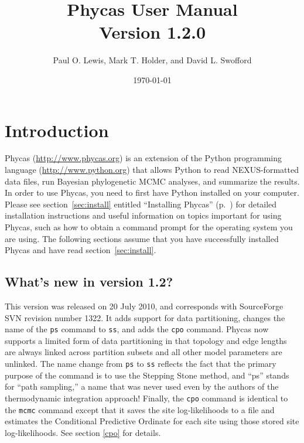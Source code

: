 \documentclass[10pt]{article}
\newcommand{\currPhycasVersion}{1.2.0}			%
\newcommand{\currReleaseDate}{20 July 2010}		%
\newcommand{\currReleaseSVNBuild}{1322}			%
\newcommand{\cmd}[1]{{\tt \small #1}\index{#1}}	%
\begin{document}
\title{{\sc Phycas User Manual} \\ Version \currPhycasVersion}
\author{Paul O. Lewis, Mark T. Holder, and David L. Swofford}
\date{\today}
\maketitle

\tableofcontents
\clearpage
\section{Introduction}

Phycas (\url{http://www.phycas.org}) is an extension of the Python programming language (\url{http://www.python.org}) that allows Python to read NEXUS-formatted data files, run Bayesian phylogenetic MCMC analyses, and summarize the results. In order to use Phycas, you need to first have Python installed on your computer. Please see section~\ref{sec:install} entitled ``Installing Phycas'' (p.~\pageref{sec:install}) for detailed installation instructions and useful information on topics important for using Phycas, such as how to obtain a command prompt for the operating system you are using. The following sections assume that you have successfully installed Phycas and have read section~\ref{sec:install}.

\subsection{What's new in version 1.2?} %
This version was released on \currReleaseDate, and corresponds with SourceForge SVN revision number \currReleaseSVNBuild. It adds support for data partitioning, changes the name of the \cmd{ps} command to \cmd{ss}, and adds the \cmd{cpo} command. Phycas now supports a limited form of data partitioning in that topology and edge lengths are always linked across partition subsets and all other model parameters are unlinked. The name change from \cmd{ps} to \cmd{ss} reflects the fact that the primary purpose of the command is to use the Stepping Stone method, and ``ps'' stands for ``path sampling,'' a name that was never used even by the authors of the thermodynamic integration approach! Finally, the \cmd{cpo} command is identical to the \cmd{mcmc} command except that it saves the site log-likelihoods to a file and estimates the Conditional Predictive Ordinate for each site using those stored site log-likelihoods. See section \ref{cpo} for details. 
\end{document}
